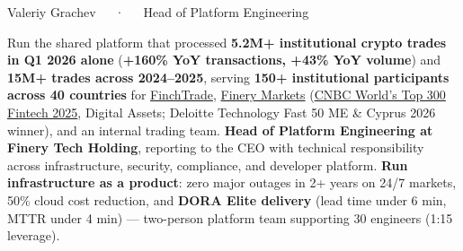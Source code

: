 \documentclass[10pt, a4paper]{awesome-cv}
\begin{document}
\makecvheader[C]

\makecvfooter
  {}
  {Valeriy Grachev~~~·~~~Head of Platform Engineering}
  {\thepage}


\begin{cvparagraph}
Run the shared platform that processed \textbf{5.2M+ institutional crypto trades in Q1 2026 alone} (\textbf{+160\% YoY transactions, +43\% YoY volume}) and \textbf{15M+ trades across 2024--2025}, serving \textbf{150+ institutional participants across 40 countries} for \href{https://finchtrade.com}{FinchTrade}, \href{https://finerymarkets.com}{Finery Markets} (\href{https://www.cnbc.com/2025/06/19/the-worlds-top-fintech-companies-2025.html}{CNBC World's Top 300 Fintech 2025}, Digital Assets; Deloitte Technology Fast 50 ME \& Cyprus 2026 winner), and an internal trading team. \textbf{Head of Platform Engineering at Finery Tech Holding}, reporting to the CEO with technical responsibility across infrastructure, security, compliance, and developer platform. \textbf{Run infrastructure as a product}: zero major outages in 2+ years on 24/7 markets, 50\% cloud cost reduction, and \textbf{DORA Elite delivery} (lead time under 6 min, MTTR under 4 min) --- two-person platform team supporting 30 engineers (1:15 leverage).
\end{cvparagraph}

\end{document}
